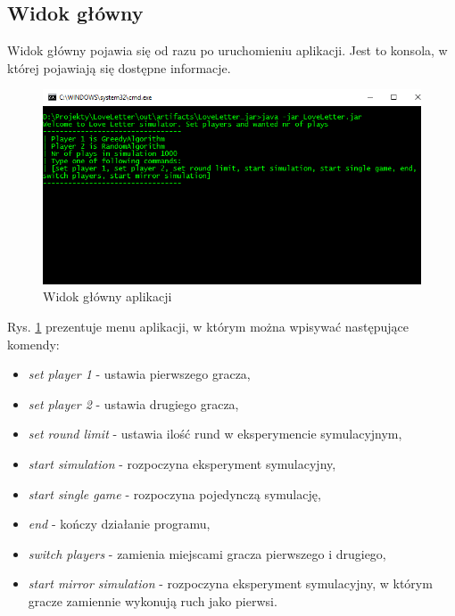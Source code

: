 \subsection*{Widok główny}
Widok główny pojawia się od razu po uruchomieniu aplikacji. Jest to konsola, w której pojawiają się dostępne informacje.
\begin{figure}[H]
	\centering
	\includegraphics[width=\textwidth]{Resources/cli.PNG}
	\caption{Widok główny aplikacji} 
	\label{fig:cli}
\end{figure}
Rys. \ref{fig:cli} prezentuje menu aplikacji, w którym można wpisywać następujące komendy:
\begin{itemize}
	\item \textit{set player 1} - ustawia pierwszego gracza,
	\item \textit{set player 2} - ustawia drugiego gracza,
	\item \textit{set round limit} - ustawia ilość rund w eksperymencie symulacyjnym,
	\item \textit{start simulation} - rozpoczyna eksperyment symulacyjny,
	\item \textit{start single game} - rozpoczyna pojedynczą symulację,
	\item \textit{end} - kończy działanie programu,
	\item \textit{switch players} - zamienia miejscami gracza pierwszego i drugiego,
	\item \textit{start mirror simulation} - rozpoczyna eksperyment symulacyjny, w którym gracze zamiennie wykonują ruch jako pierwsi.
\end{itemize}

\clearpage
